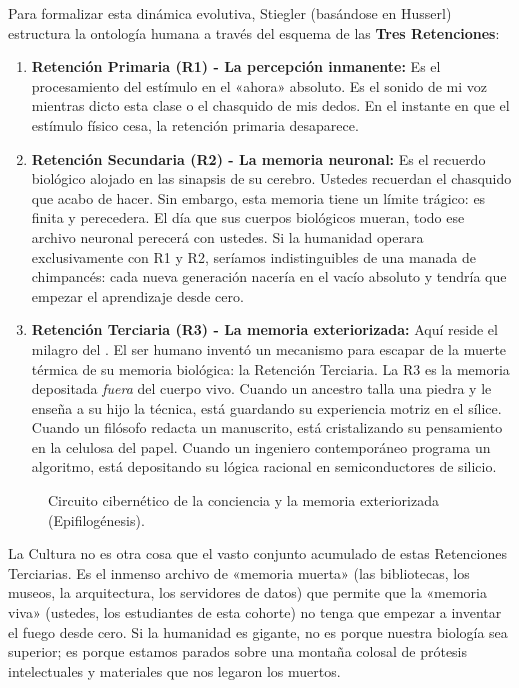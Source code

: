 Para formalizar esta dinámica evolutiva, Stiegler (basándose en Husserl) estructura la ontología humana a través del esquema de las \textbf{Tres Retenciones}:

\begin{enumerate}
    \item \textbf{Retención Primaria (R1) - La percepción inmanente:} Es el procesamiento del estímulo en el «ahora» absoluto. Es el sonido de mi voz mientras dicto esta clase o el chasquido de mis dedos. En el instante en que el estímulo físico cesa, la retención primaria desaparece.
    \item \textbf{Retención Secundaria (R2) - La memoria neuronal:} Es el recuerdo biológico alojado en las sinapsis de su cerebro. Ustedes recuerdan el chasquido que acabo de hacer. Sin embargo, esta memoria tiene un límite trágico: es finita y perecedera. El día que sus cuerpos biológicos mueran, todo ese archivo neuronal perecerá con ustedes. Si la humanidad operara exclusivamente con R1 y R2, seríamos indistinguibles de una manada de chimpancés: cada nueva generación nacería en el vacío absoluto y tendría que empezar el aprendizaje desde cero.
    \item \textbf{Retención Terciaria (R3) - La memoria exteriorizada:} Aquí reside el milagro del \AnimalSimbolico. El ser humano inventó un mecanismo para escapar de la muerte térmica de su memoria biológica: la Retención Terciaria. La R3 es la memoria depositada \textit{fuera} del cuerpo vivo. Cuando un ancestro talla una piedra y le enseña a su hijo la técnica, está guardando su experiencia motriz en el sílice. Cuando un filósofo redacta un manuscrito, está cristalizando su pensamiento en la celulosa del papel. Cuando un ingeniero contemporáneo programa un algoritmo, está depositando su lógica racional en semiconductores de silicio.
\end{enumerate}

\begin{figure}[htbp]
    \centering
    
    \caption{Circuito cibernético de la conciencia y la memoria exteriorizada (Epifilogénesis).}
    \label{fig:esquema_retenciones}
\end{figure}

La Cultura no es otra cosa que el vasto conjunto acumulado de estas Retenciones Terciarias. Es el inmenso archivo de «memoria muerta» (las bibliotecas, los museos, la arquitectura, los servidores de datos) que permite que la «memoria viva» (ustedes, los estudiantes de esta cohorte) no tenga que empezar a inventar el fuego desde cero. Si la humanidad es gigante, no es porque nuestra biología sea superior; es porque estamos parados sobre una montaña colosal de prótesis intelectuales y materiales que nos legaron los muertos.

